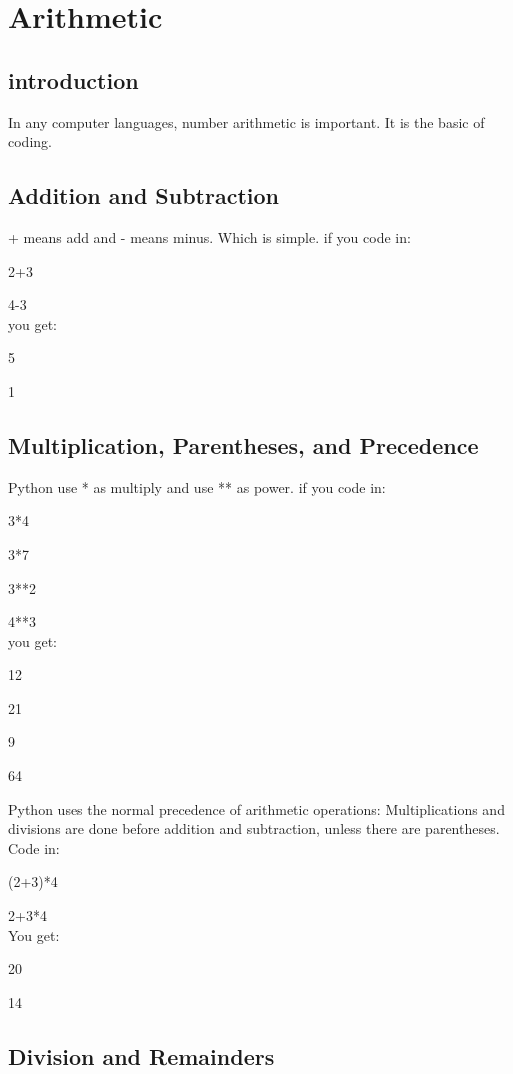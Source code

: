 \chapter{Arithmetic}

\section{introduction}
 In any computer languages, number arithmetic is important. It is the basic of coding.
   
\section{Addition and Subtraction}
 + means add and - means minus. Which is simple. if you code in:
 
 2+3
      
 4-3\\

 you get:
 
 5
 
 1
 
 \section{Multiplication, Parentheses, and Precedence}
 Python use * as multiply and use ** as power. if you code in:
 
 3*4
 
 3*7
 
 3**2
 
 4**3\\
 
 you get:
 
 12
 
 21
 
 9
 
 64
 
Python uses the normal precedence of arithmetic operations: Multiplications and divisions are done before addition and subtraction, unless there are parentheses.  Code in:
 
 (2+3)*4
 
 2+3*4\\
 
 You get:
 
 20
 
 14
 
  \section{Division and Remainders}
  
